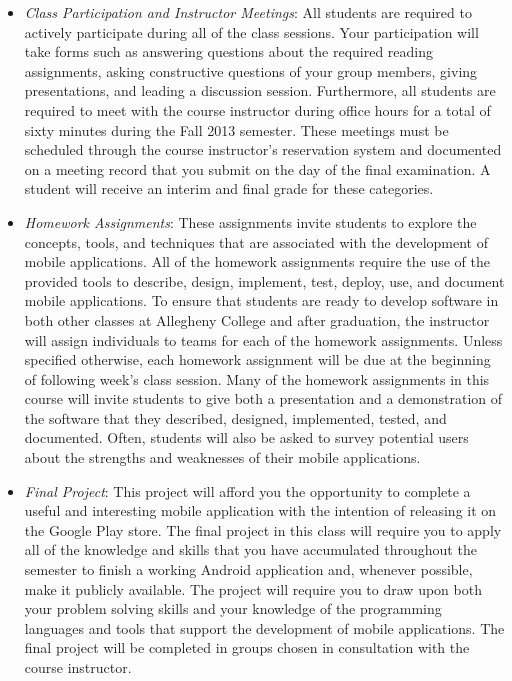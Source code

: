 \begin{itemize}

	\item {\em Class Participation and Instructor Meetings}: All students are required to actively participate during
		all of the class sessions. Your participation will take forms such as answering questions about the required
		reading assignments, asking constructive questions of your group members, giving presentations, and leading a
		discussion session. Furthermore, all students are required to meet with the course instructor during office
		hours for a total of sixty minutes during the Fall 2013 semester.  These meetings must be scheduled through the
		course instructor's reservation system and documented on a meeting record that you submit on the day of the final
		examination. A student will receive an interim and final grade for these categories.

	\item {\em Homework Assignments}: These assignments invite students to explore the concepts, tools, and techniques
		that are associated with the development of mobile applications.  All of the homework assignments require the
		use of the provided tools to describe, design, implement, test, deploy, use, and document mobile applications.
		To ensure that students are ready to develop software in both other classes at Allegheny College and after
		graduation, the instructor will assign individuals to teams for each of the homework assignments.  Unless
		specified otherwise, each homework assignment will be due at the beginning of following week's class session.  Many of
		the homework assignments in this course will invite students to give both a presentation and a demonstration of
		the software that they described, designed, implemented, tested, and documented. Often, students will also be
		asked to survey potential users about the strengths and weaknesses of their mobile applications.
	
	\item {\em Final Project}: This project will afford you the opportunity to complete a useful and interesting mobile
		application with the intention of releasing it on the Google Play store.	The final project in this class will
		require you to apply all of the knowledge and skills that you have accumulated throughout the semester
		to finish a working Android application and, whenever possible, make it publicly available.  The project will
		require you to draw upon both your problem solving skills and your knowledge of the programming languages and tools
		that support the development of mobile applications. The final project will be completed in groups chosen in
		consultation with the course instructor.
		
\end{itemize}

